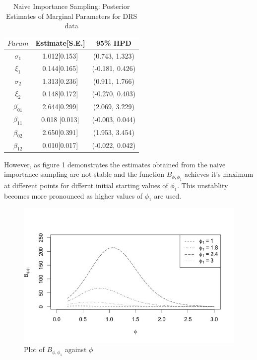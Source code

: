 \documentclass[11pt]{article}
\theoremstyle{remboldstyle}
\begin{document}
\begin{table}[H]
\caption{Naive Importance Sampling: Posterior Estimates of Marginal Parameters for DRS data}
\centering
\begin{tabular}{c c c}
\hline
$Param$      & Estimate[S.E.] & 95\% HPD\\
\hline
$\sigma_1$      & 1.012[0.153]        & (0.743, 1.323)\\   
$\xi_1$      & 0.144[0.165]        & (-0.181, 0.426)\\
$\sigma_2$ & 1.313[0.236]              & (0.911, 1.766)\\
$\xi_2$      & 0.148[0.172]        & (-0.270, 0.403)\\   
$\beta_{01}$      & 2.644[0.299]        & (2.069, 3.229)\\
$\beta_{11}$ & 0.018 [0.013]             & (-0.003, 0.044)\\
$\beta_{02}$      & 2.650[0.391]        & (1.953, 3.454)\\   
$\beta_{12}$      & 0.010[0.017]        & (-0.022, 0.042)\\
 \hline             
\end{tabular}
\label{tab3}
\end{table}
\noindent
However, as figure 1 demonstrates the estimates obtained from the naive importance sampling are not stable and the function $B_{\phi, \phi_1}$ achieves it's maximum at different points for differnt initial starting values of $\phi_1$. This unstablity becomes more pronounced as higher values of $\phi_1$ are used. \\
\begin{figure}[H]
\begin{center}
\includegraphics[scale=0.4]{plot1_new.jpeg}
\end{center}
\caption{Plot of $B_{\phi, \phi_1}$ against $\phi$}
\end{figure}
\end{document}
